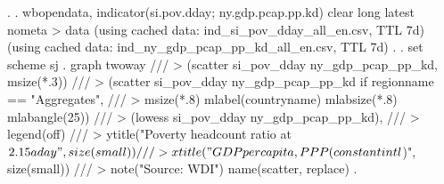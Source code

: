 . 
. wbopendata, indicator(si.pov.dday; ny.gdp.pcap.pp.kd) clear long latest nometa
> data
(using cached data: ind_si_pov_dday_all_en.csv, TTL 7d)
(using cached data: ind_ny_gdp_pcap_pp_kd_all_en.csv, TTL 7d)
{\smallskip}
. 
. set scheme sj
{\smallskip}
. graph twoway ///
>     (scatter si_pov_dday ny_gdp_pcap_pp_kd, msize(*.3)) ///
>     (scatter si_pov_dday ny_gdp_pcap_pp_kd if regionname == "Aggregates", ///
>         msize(*.8) mlabel(countryname) mlabsize(*.8) mlabangle(25)) ///
>     (lowess si_pov_dday ny_gdp_pcap_pp_kd), ///
>         legend(off) ///
>         ytitle("Poverty headcount ratio at $2.15 a day", size(small)) ///
>         xtitle("GDP per capita, PPP (constant intl $)", size(small)) ///
>         note("Source: WDI") name(scatter, replace)
{\smallskip}
. 
